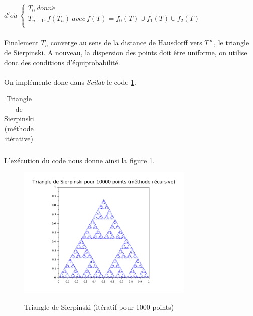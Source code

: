 \documentclass[a4paper,10pt]{report}
\begin{document}
$d'o\grave{u} \
\left\lbrace
\begin{array}{l}
T_0 \ donn\acute{e} \\
T_{n+1} : f(T_n) \ avec \ f(T)=f_0(T)\cup f_1(T)\cup f_2(T)\\
\end{array}\right.$\\ \\
Finalement $T_n$ converge au sens de la distance de Hausdorff vers $T^\infty$, le triangle de Sierpinski. A nouveau, la dispersion des points doit être uniforme, on utilise donc des conditions d'équiprobabilité. \\ \\

\indent On implémente donc dans \textit{Scilab} le code \ref{code_sierpinski_it}.
\begin{table}[H]
\caption{Triangle de Sierpinski (méthode itérative)}
\begin{tabular}{l}
\\
\end{tabular}
\label{code_sierpinski_it}
\end{table}
\newpage
L'exécution du code nous donne ainsi la figure \ref{sierpinski_iteratif}.
\begin{figure}[H]
\centering
\caption{Triangle de Sierpinski (itératif pour 1000 points)}
\includegraphics[width=0.75\textwidth]{sierpinski_iteratif.pdf}
\label{sierpinski_iteratif}
\end{figure}
\end{document}
